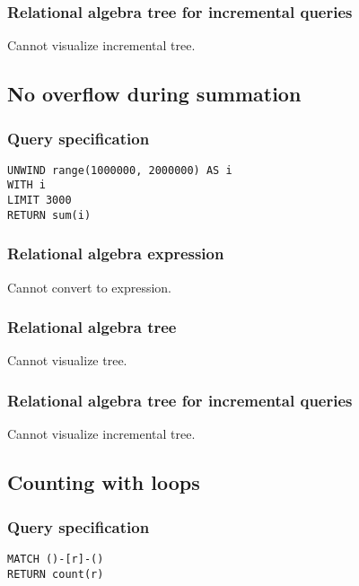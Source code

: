 \subsubsection*{Relational algebra tree for incremental queries}

Cannot visualize incremental tree.

\subsection{No overflow during summation}

\subsubsection*{Query specification}

\begin{lstlisting}
UNWIND range(1000000, 2000000) AS i
WITH i
LIMIT 3000
RETURN sum(i)
\end{lstlisting}

\subsubsection*{Relational algebra expression}

Cannot convert to expression.

\subsubsection*{Relational algebra tree}

Cannot visualize tree.

\subsubsection*{Relational algebra tree for incremental queries}

Cannot visualize incremental tree.

\subsection{Counting with loops}

\subsubsection*{Query specification}

\begin{lstlisting}
MATCH ()-[r]-()
RETURN count(r)
\end{lstlisting}

